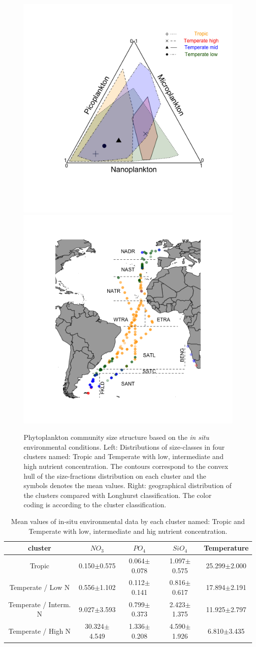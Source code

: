 \begin{figure}
\includegraphics[trim = 12mm 10mm 10mm 15mm, clip, width=0.5\linewidth]{./Chp2-Pre/amt_clsEnvFINAL4.png}
\includegraphics[trim = 20mm 10mm 20mm 10mm, clip, width=0.5\linewidth]{./Chp2-Pre/amt_mapClsEnv3.png}
\caption[Scheme]{\small {Phytoplankton community size structure based on the \textit{in situ} environmental conditions. Left: Distributions of size-classes in four clusters named: Tropic and Temperate with low, intermediate and high nutrient concentration. The contours correspond to the convex hull of the size-fractions distribution on each cluster and the symbols denotes the mean values.  Right: geographical distribution of the clusters compared with Longhurst classification. The color coding is according to the cluster classification.}}
\label{clusters}
\end{figure}

\begin{table}
\centering
\caption[Scheme]{\small {Mean values of in-situ environmental data by each cluster named: Tropic and Temperate with low, intermediate and hig nutrient concentration.}}
\label{tableclus}
\begin{tabular} {c c c c c}
cluster & $NO_3$ & $PO_4$ & $SiO_4$ & Temperature \\ \hline
Tropic & 0.150$\pm$0.575 & 0.064$\pm$0.078 & 1.097$\pm$0.575 & 25.299$\pm$2.000 \\
Temperate / Low N & 0.556$\pm$1.102 & 0.112$\pm$0.141 & 0.816$\pm$0.617 & 17.894$\pm$2.191 \\
Temperate / Interm. N & 9.027$\pm$3.593 & 0.799$\pm$0.373 & 2.423$\pm$1.375 & 11.925$\pm$2.797 \\
Temperate / High N & 30.324$\pm$4.549 & 1.336$\pm$0.208 & 4.590$\pm$1.926 & 6.810$\pm$3.435 \\ \hline
\end{tabular}
\end{table}

